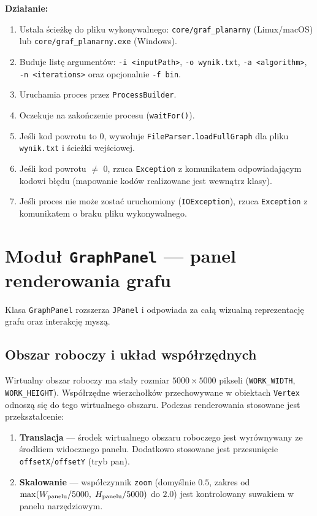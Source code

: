\documentclass[a4paper, 11pt]{article}
\begin{document}
\textbf{Działanie:}
\begin{enumerate}
  \item Ustala ścieżkę do pliku wykonywalnego: \texttt{core/graf\_planarny}
    (Linux/macOS) lub \texttt{core/graf\_planarny.exe} (Windows).
  \item Buduje listę argumentów: \texttt{-i <inputPath>},
    \texttt{-o wynik.txt}, \texttt{-a <algorithm>},
    \texttt{-n <iterations>} oraz opcjonalnie \texttt{-f bin}.
  \item Uruchamia proces przez \texttt{ProcessBuilder}.
  \item Oczekuje na zakończenie procesu (\texttt{waitFor()}).
  \item Jeśli kod powrotu to 0, wywołuje \texttt{FileParser.loadFullGraph}
    dla pliku \texttt{wynik.txt} i ścieżki wejściowej.
  \item Jeśli kod powrotu $\neq$ 0, rzuca \texttt{Exception}
    z komunikatem odpowiadającym kodowi błędu (mapowanie kodów
    realizowane jest wewnątrz klasy).
  \item Jeśli proces nie może zostać uruchomiony (\texttt{IOException}),
    rzuca \texttt{Exception} z komunikatem o braku pliku wykonywalnego.
\end{enumerate}

\section{Moduł \texttt{GraphPanel} --- panel renderowania grafu}

Klasa \texttt{GraphPanel} rozszerza \texttt{JPanel} i odpowiada za całą
wizualną reprezentację grafu oraz interakcję myszą.

\subsection{Obszar roboczy i układ współrzędnych}

Wirtualny obszar roboczy ma stały rozmiar $5000 \times 5000$ pikseli
(\texttt{WORK\_WIDTH}, \texttt{WORK\_HEIGHT}). Współrzędne wierzchołków
przechowywane w obiektach \texttt{Vertex} odnoszą się do tego wirtualnego
obszaru. Podczas renderowania stosowane jest przekształcenie:

\begin{enumerate}
  \item \textbf{Translacja} --- środek wirtualnego obszaru roboczego
    jest wyrównywany ze środkiem widocznego panelu. Dodatkowo stosowane
    jest przesunięcie \texttt{offsetX}/\texttt{offsetY} (tryb pan).
  \item \textbf{Skalowanie} --- współczynnik \texttt{zoom} (domyślnie
    $0.5$, zakres od $\max(W_{\text{panelu}}/5000,\\\; H_{\text{panelu}}/5000)$
    do $2.0$) jest kontrolowany suwakiem w panelu narzędziowym.
\end{enumerate}
\end{document}
